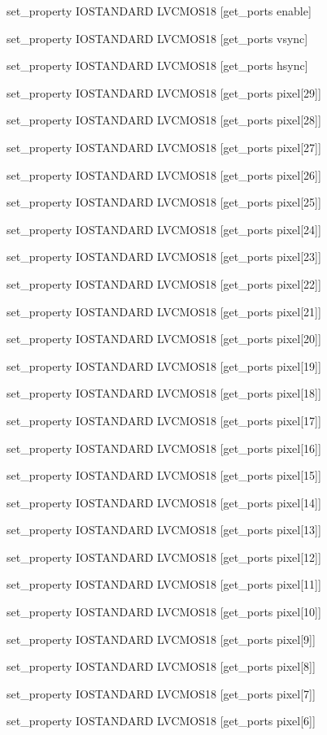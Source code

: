 set\_property IOSTANDARD LVCMOS18 [get\_ports enable]

set\_property IOSTANDARD LVCMOS18 [get\_ports vsync]

set\_property IOSTANDARD LVCMOS18 [get\_ports hsync]

set\_property IOSTANDARD LVCMOS18 [get\_ports {pixel[29]}]

set\_property IOSTANDARD LVCMOS18 [get\_ports {pixel[28]}]

set\_property IOSTANDARD LVCMOS18 [get\_ports {pixel[27]}]

set\_property IOSTANDARD LVCMOS18 [get\_ports {pixel[26]}]

set\_property IOSTANDARD LVCMOS18 [get\_ports {pixel[25]}]

set\_property IOSTANDARD LVCMOS18 [get\_ports {pixel[24]}]

set\_property IOSTANDARD LVCMOS18 [get\_ports {pixel[23]}]

set\_property IOSTANDARD LVCMOS18 [get\_ports {pixel[22]}]

set\_property IOSTANDARD LVCMOS18 [get\_ports {pixel[21]}]

set\_property IOSTANDARD LVCMOS18 [get\_ports {pixel[20]}]

set\_property IOSTANDARD LVCMOS18 [get\_ports {pixel[19]}]

set\_property IOSTANDARD LVCMOS18 [get\_ports {pixel[18]}]

set\_property IOSTANDARD LVCMOS18 [get\_ports {pixel[17]}]

set\_property IOSTANDARD LVCMOS18 [get\_ports {pixel[16]}]

set\_property IOSTANDARD LVCMOS18 [get\_ports {pixel[15]}]

set\_property IOSTANDARD LVCMOS18 [get\_ports {pixel[14]}]

set\_property IOSTANDARD LVCMOS18 [get\_ports {pixel[13]}]

set\_property IOSTANDARD LVCMOS18 [get\_ports {pixel[12]}]

set\_property IOSTANDARD LVCMOS18 [get\_ports {pixel[11]}]

set\_property IOSTANDARD LVCMOS18 [get\_ports {pixel[10]}]

set\_property IOSTANDARD LVCMOS18 [get\_ports {pixel[9]}]

set\_property IOSTANDARD LVCMOS18 [get\_ports {pixel[8]}]

set\_property IOSTANDARD LVCMOS18 [get\_ports {pixel[7]}]

set\_property IOSTANDARD LVCMOS18 [get\_ports {pixel[6]}]

